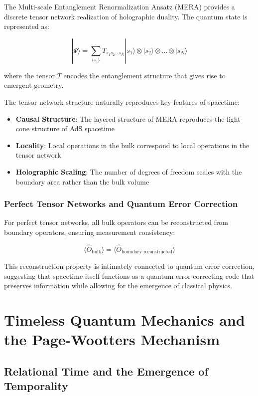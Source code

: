 \documentclass[12pt,a4paper]{article}
\newcommand{\ket}[1]{|#1\rangle}
\newcommand{\expect}[1]{\langle#1\rangle}
\newcommand{\op}[1]{\hat{#1}}
\begin{document}
The Multi-scale Entanglement Renormalization Ansatz (MERA) provides a discrete tensor network realization of holographic duality. The quantum state is represented as:

\begin{equation}
    \ket{\Psi} = \sum_{\{s_i\}} T_{s_1s_2...s_N} \ket{s_1} \otimes \ket{s_2} \otimes ... \otimes \ket{s_N}
\end{equation}

where the tensor $T$ encodes the entanglement structure that gives rise to emergent geometry.

The tensor network structure naturally reproduces key features of spacetime:

\begin{itemize}
    \item \textbf{Causal Structure}: The layered structure of MERA reproduces the light-cone structure of AdS spacetime
    \item \textbf{Locality}: Local operations in the bulk correspond to local operations in the tensor network
    \item \textbf{Holographic Scaling}: The number of degrees of freedom scales with the boundary area rather than the bulk volume
\end{itemize}

\subsubsection{Perfect Tensor Networks and Quantum Error Correction}

For perfect tensor networks, all bulk operators can be reconstructed from boundary operators, ensuring measurement consistency:

\begin{equation}
    \expect{\op{O}_{\text{bulk}}} = \expect{\op{O}_{\text{boundary reconstructed}}}
\end{equation}

This reconstruction property is intimately connected to quantum error correction, suggesting that spacetime itself functions as a quantum error-correcting code that preserves information while allowing for the emergence of classical physics.

\section{Timeless Quantum Mechanics and the Page-Wootters Mechanism}

\subsection{Relational Time and the Emergence of Temporality}
\end{document}
